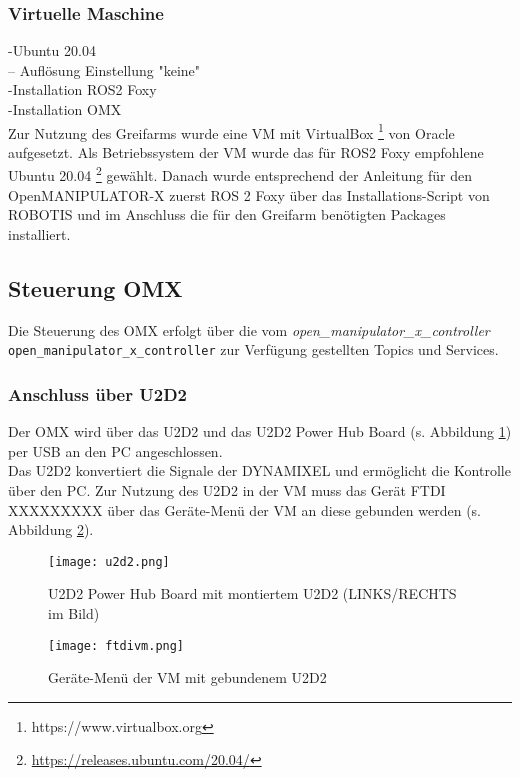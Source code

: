 \subsubsection{Virtuelle Maschine}
-Ubuntu 20.04\\
-- Auflösung Einstellung "keine"\\
-Installation ROS2 Foxy\\
-Installation OMX\\
Zur Nutzung des Greifarms wurde eine \ac{VM} mit VirtualBox {\footnote{https://www.virtualbox.org}} von Oracle aufgesetzt. Als Betriebssystem der \ac{VM} wurde das für ROS2 Foxy empfohlene \citep{foxyreq} Ubuntu 20.04 {\footnote{\url{https://releases.ubuntu.com/20.04/}}} gewählt. Danach wurde entsprechend der Anleitung für den OpenMANIPULATOR-X \citep{foxyinstall} zuerst ROS 2 Foxy über das Installations-Script von ROBOTIS und im Anschluss die für den Greifarm benötigten Packages installiert.


\subsection{Steuerung OMX}
Die Steuerung des OMX erfolgt über die vom \emph{open\_manipulator\_x\_controller}\\ \verb|open_manipulator_x_controller| zur Verfügung gestellten Topics und Services.



\subsubsection{Anschluss über U2D2}{\label{u2d2}}
Der OMX wird über das U2D2 und das U2D2 Power Hub Board (s. Abbildung \ref{fig:u2d2}) per USB an den PC angeschlossen.\\
Das U2D2 konvertiert die Signale der DYNAMIXEL und ermöglicht die Kontrolle über den PC. Zur Nutzung des U2D2 in der \ac{VM} muss das Gerät FTDI XXXXXXXXX über das Geräte-Menü der \ac{VM} an diese gebunden werden (s. Abbildung \ref{fig:ftdivm}).
\begin{figure}[ht!]
\centering
\texttt{[image: u2d2.png]}
\caption{U2D2 Power Hub Board mit montiertem U2D2 (LINKS/RECHTS im Bild)}
\label{fig:u2d2}
\end{figure}
\begin{figure}[ht!]
\centering
\texttt{[image: ftdivm.png]}
\caption{Geräte-Menü der \ac{VM} mit gebundenem U2D2}
\label{fig:ftdivm}
\end{figure}



